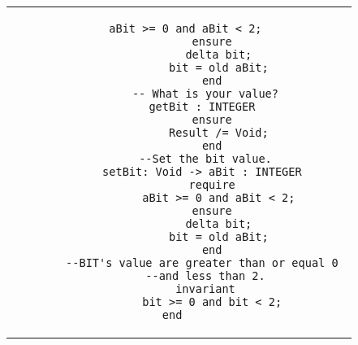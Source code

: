 \begin{center}
\begin{tabular}{ c  c }
\begin{minipage}[l]{6.4cm}
\end{minipage}  
&
\begin{minipage}[l]{6.6cm}
\begin{lstlisting}[language=Bon]
          aBit >= 0 and aBit < 2;
        ensure
          delta bit;
          bit = old aBit;
        end
      -- What is your value?
      getBit : INTEGER 
        ensure
          Result /= Void;
        end
      --Set the bit value.
      setBit: Void -> aBit : INTEGER 
        require
          aBit >= 0 and aBit < 2;
        ensure
          delta bit;
          bit = old aBit;
        end
      --BIT's value are greater than or equal 0 
      --and less than 2.
      invariant
        bit >= 0 and bit < 2;
end    
\end{lstlisting}
\end{minipage}  
\end{tabular}
\end{center}
